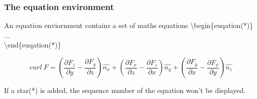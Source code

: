 \documentclass{beamer}
\begin{document}
\begin{frame}
	\frametitle{The equation environment}
	\begin{definition}
		An {\color{blue}equation} enviornment contains a set of maths equations
		{\color{red}\textbackslash begin\{euqation(*)\}}\\
		\quad ...\\
		{\color{red}\textbackslash end\{euqation(*)\}}\\
	\end{definition}
	\begin{example}
		\begin{equation}
		curl\ F=\left(\frac{\partial F_z}{\partial y}-\frac{\partial F_y}{\partial z}\right)\hat{n_x}+\left(\frac{\partial F_x}{\partial z}-\frac{\partial F_z}{\partial x}\right)\hat{n_y}+\left(\frac{\partial F_y}{\partial x}-\frac{\partial F_x}{\partial y}\right)\hat{n_z}
		\end{equation}
	\end{example}
	If a star({\color{blue}*}) is added, the sequence number of the equation won't be displayed.
\end{frame}
\end{document}
